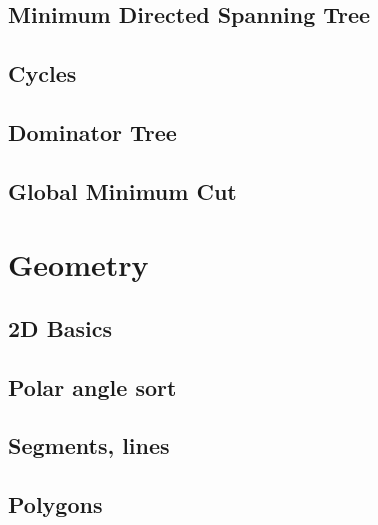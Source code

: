 \subsection{Minimum Directed Spanning Tree}
\raggedbottom
\hrulefill
\subsection{Cycles}
\raggedbottom
\hrulefill
\subsection{Dominator Tree}
\raggedbottom
\hrulefill
\subsection{Global Minimum Cut}
\raggedbottom
\hrulefill



\section{Geometry}
\subsection{2D Basics}
\raggedbottom
\hrulefill
\subsection{Polar angle sort}
\raggedbottom
\hrulefill
\subsection{Segments, lines}
\raggedbottom
\hrulefill
\subsection{Polygons}
\raggedbottom
\hrulefill
